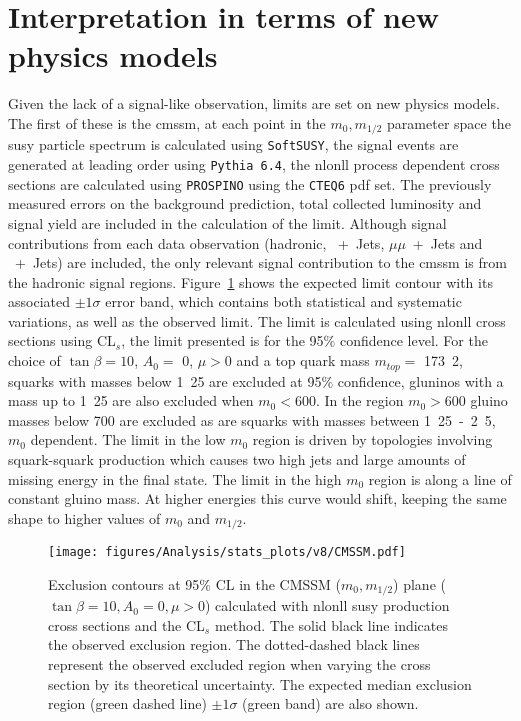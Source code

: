 \section{Interpretation in terms of new physics models} %
\label{cha:interpretation_in_terms_of_new_physics_models_}
Given the lack of a signal-like observation, limits are set on new physics 
models. The first of these is the \ac{cmssm}, at each point in the $m_{0}, 
m_{1/2}$ parameter space the \ac{susy} particle spectrum is calculated using 
\texttt{SoftSUSY}, the signal events are generated at 
leading order using \texttt{Pythia 6.4}, the \ac{nlonll} process 
dependent  cross sections are calculated using 
\texttt{PROSPINO} using the \texttt{CTEQ6} 
\ac{pdf} set. The previously measured errors on the background prediction, 
total collected luminosity and signal yield are included in the calculation of 
the limit. Although signal contributions from each data observation (hadronic, 
\Pmu~+~Jets, $\mu\mu$~+~Jets and \Pphoton~+~Jets) are included, the only 
relevant signal contribution to the \ac{cmssm} is from the hadronic signal 
regions.
Figure~\ref{fig:cmssm-limit} shows the expected limit contour with its 
associated $\pm1\sigma$ error band, which contains both statistical and 
systematic variations, as well as the observed limit. The limit is 
calculated using \ac{nlonll} cross sections using CL$_s$, the 
limit presented is for the 95$\%$ confidence level. For the choice of 
$\tan\beta = 10$, $A_0 = $ \unit{0}{\GeV}, $\mu > 0$ and a top quark mass 
$m_{top} = $ \unit{173.2}{\GeV}, squarks with masses below \unit{1.25}{\TeV} 
are excluded at 95$\%$ confidence, gluninos with a mass up to \unit{1.25}{\TeV} 
are also excluded when $m_{0} < $\unit{600}{\GeV}. In the region $m_{0} > 
$\unit{600}{\GeV} gluino masses below \unit{700}{\GeV} are excluded as are 
squarks with masses between \unit{1.25-2.5}{\TeV}, $m_{0}$ dependent. The limit in the low $m_{0}$ region is driven by topologies involving squark-squark production which causes two high \ET jets and large amounts of missing energy in the final state. The limit in the high $m_{0}$ region is along a line of constant gluino mass. At higher energies this curve would shift, keeping the same shape to higher values of $m_{0}$ and $m_{1/2}$. 

\begin{figure}[h!]
  \begin{center}
    \texttt{[image: figures/Analysis/stats\_plots/v8/CMSSM.pdf]}
    \caption{\label{fig:cmssm-limit} Exclusion contours at 95$\%$ CL in
      the CMSSM ($m_0, m_{1/2}$) plane ($\tan \beta = 10, A_0 = 0, \mu
      > 0$) calculated with \ac{nlonll} \ac{susy} production cross sections and
      the CL$_{s}$ method. The solid black line indicates the observed
      exclusion region. The dotted-dashed black lines represent the
      observed excluded region when varying the cross section by its
      theoretical uncertainty. The expected median exclusion region
      (green dashed line) $\pm 1 \sigma$ (green band) are also shown.}
  \end{center}
\end{figure}


